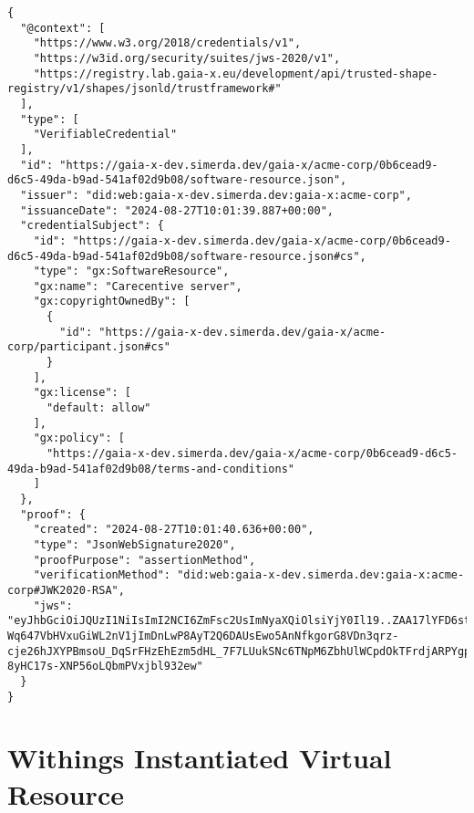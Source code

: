 \begin{verbatim}
{
  "@context": [
    "https://www.w3.org/2018/credentials/v1",
    "https://w3id.org/security/suites/jws-2020/v1",
    "https://registry.lab.gaia-x.eu/development/api/trusted-shape-registry/v1/shapes/jsonld/trustframework#"
  ],
  "type": [
    "VerifiableCredential"
  ],
  "id": "https://gaia-x-dev.simerda.dev/gaia-x/acme-corp/0b6cead9-d6c5-49da-b9ad-541af02d9b08/software-resource.json",
  "issuer": "did:web:gaia-x-dev.simerda.dev:gaia-x:acme-corp",
  "issuanceDate": "2024-08-27T10:01:39.887+00:00",
  "credentialSubject": {
    "id": "https://gaia-x-dev.simerda.dev/gaia-x/acme-corp/0b6cead9-d6c5-49da-b9ad-541af02d9b08/software-resource.json#cs",
    "type": "gx:SoftwareResource",
    "gx:name": "Carecentive server",
    "gx:copyrightOwnedBy": [
      {
        "id": "https://gaia-x-dev.simerda.dev/gaia-x/acme-corp/participant.json#cs"
      }
    ],
    "gx:license": [
      "default: allow"
    ],
    "gx:policy": [
      "https://gaia-x-dev.simerda.dev/gaia-x/acme-corp/0b6cead9-d6c5-49da-b9ad-541af02d9b08/terms-and-conditions"
    ]
  },
  "proof": {
    "created": "2024-08-27T10:01:40.636+00:00",
    "type": "JsonWebSignature2020",
    "proofPurpose": "assertionMethod",
    "verificationMethod": "did:web:gaia-x-dev.simerda.dev:gaia-x:acme-corp#JWK2020-RSA",
    "jws": "eyJhbGciOiJQUzI1NiIsImI2NCI6ZmFsc2UsImNyaXQiOlsiYjY0Il19..ZAA17lYFD6sti9q_h4FKw5zJ0TZ0P0b7DDlZ80y1nPiJbdyPo9Y6vphQU7o136iu2sjocaZvzV100mzbS2PzdhnT7PEI1T6tYxKK4eC347sBzgoEdzQEQshBRhGb5p9zwu5kRof39Dapu33H7VE-Wq647VbHVxuGiWL2nV1jImDnLwP8AyT2Q6DAUsEwo5AnNfkgorG8VDn3qrz-cje26hJXYPBmsoU_DqSrFHzEhEzm5dHL_7F7LUukSNc6TNpM6ZbhUlWCpdOkTFrdjARPYgpf9OfRcCGBZMl9bkHZ7bQ8uEo9Uu9hiefL-8yHC17s-XNP56oLQbmPVxjbl932ew"
  }
}
\end{verbatim}

\section{Withings Instantiated Virtual Resource}

